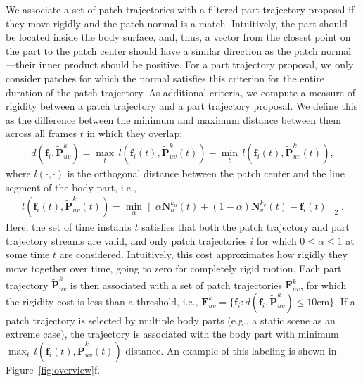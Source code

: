 We associate a set of patch trajectories with a filtered part trajectory proposal if they move rigidly and the patch normal is a match. Intuitively, the part should be located inside the body surface, and, thus, a vector from the closest point on the part to the patch center should have a similar direction as the patch normal---their inner product should be positive. For a part trajectory proposal, we only consider patches for which the normal satisfies this criterion for the entire duration of the patch trajectory. As additional criteria, we compute a measure of rigidity between a patch trajectory and a part trajectory proposal. We define this as the difference between the minimum and maximum distance between them across all frames $t$ in which they overlap:
\begin{gather}
d(\mathbf{f}_i,\mathbf{\tilde P}_{uv}^k) = \max_t \, l\!\left(\mathbf{f}_i(t),\mathbf{\tilde P}_{uv}^k(t)\right)  - \min_t \, l\!\left(\mathbf{f}_i(t), \mathbf{\tilde P}_{uv}^k(t)\right),   \nonumber
\end{gather}
where $l( \cdot, \cdot )$ is the orthogonal distance between the patch center and the line segment of the body part, i.e.,
\begin{gather}
l\!\left(\mathbf{f}_i(t),\mathbf{\tilde P}_{uv}^k(t)\right) = \min_\alpha \| \alpha \mathbf{N}_{u}^{k_u}(t) {+}(1{-}\alpha)\mathbf{N}_{v}^{k_v}(t)  - \mathbf{f}_i(t)\|_2. \nonumber
\label{eq:segment_distance}
\end{gather}
Here, the set of time instants $t$ satisfies that both the patch trajectory and part trajectory streams are valid, and only patch trajectories $i$ for which $0{\leq}\alpha{\leq}1$ at some time $t$ are considered. Intuitively, this cost approximates how rigidly they move together over time, going to zero for completely rigid motion. Each part trajectory $\mathbf{\tilde{P}}^k_{uv}$ is then associated with a set of patch trajectories $\mathbf{F}^k_{uv}$, for which the rigidity cost is less than a threshold, i.e., $\mathbf{F}^k_{uv} = \{ \mathbf{f}_i : d(\mathbf{f}_i,\mathbf{\tilde P}_{uv}^k){\leq}10\textrm{cm}\}$. If a patch trajectory is selected by multiple body parts (e.g., a static scene as an extreme case), the trajectory is associated with the body part with minimum $\max_t \, l (\mathbf{f}_i(t),\mathbf{\tilde P}_{uv}^k(t) )$ distance. An example of this labeling is shown in Figure~\ref{fig:overview}f.

